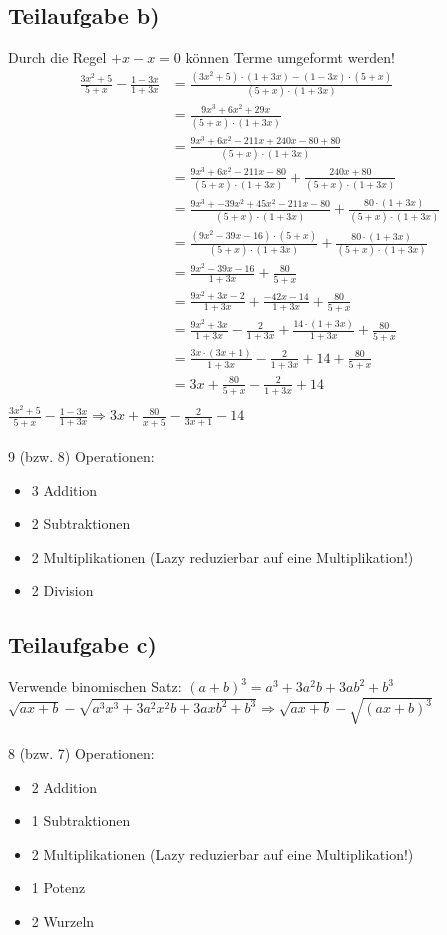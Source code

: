 \documentclass{llncs}
\begin{document}
\subsection*{Teilaufgabe b)}
Durch die Regel $+x-x=0$ können Terme umgeformt werden!
\begin{align*}
\frac{3x^2+5}{5+x}-\frac{1-3x}{1+3x}
&=\frac{(3x^2+5)\cdot (1+3x)-(1-3x)\cdot (5+x)}{(5+x)\cdot (1+3x)}\\
&=\frac{9x^3+6x^2+29x}{(5+x)\cdot (1+3x)}\\
&=\frac{9x^3+6x^2-211x+240x-80+80}{(5+x)\cdot (1+3x)}\\
&=\frac{9x^3+6x^2-211x-80}{(5+x)\cdot (1+3x)} + \frac{240x+80}{(5+x)\cdot (1+3x)}\\
&=\frac{9x^3+-39x^2+45x^2-211x-80}{(5+x)\cdot (1+3x)} + \frac{80\cdot(1+3x)}{(5+x)\cdot (1+3x)}\\
&=\frac{(9x^2-39x-16)\cdot (5+x)}{(5+x)\cdot (1+3x)} + \frac{80\cdot(1+3x)}{(5+x)\cdot (1+3x)}\\
&=\frac{9x^2-39x-16}{1+3x} + \frac{80}{5+x}\\
&=\frac{9x^2+3x-2}{1+3x}+ \frac{-42x-14}{1+3x} + \frac{80}{5+x}\\
&=\frac{9x^2+3x}{1+3x}-\frac{2}{1+3x}+ \frac{14\cdot(1+3x)}{1+3x} + \frac{80}{5+x}\\
&=\frac{3x\cdot (3x+1)}{1+3x}-\frac{2}{1+3x}+ 14 + \frac{80}{5+x}\\
&=3x+ \frac{80}{5+x}-\frac{2}{1+3x}+ 14 \\
\end{align*}
$\frac{3x^2+5}{5+x}-\frac{1-3x}{1+3x} \Rightarrow3x + \frac{80}{x+5} - \frac{2}{3x+1} - 14$\\
\\
9 (bzw. 8) Operationen:
\begin{itemize}
\item 3 Addition
\item 2 Subtraktionen
\item 2 Multiplikationen (Lazy reduzierbar auf eine Multiplikation!)
\item 2 Division
\end{itemize}
\subsection*{Teilaufgabe c)}
Verwende binomischen Satz: $(a+b)^3=a^3+3a^2b+3ab^2+b^3$\\
$\sqrt{ax+b} - \sqrt{a^3x^3+3a^2x^2b+3axb^2+b^3}\Rightarrow \sqrt{ax+b} - \sqrt{(ax+b)^3}$\\
\\
8 (bzw. 7) Operationen:
\begin{itemize}
\item 2 Addition
\item 1 Subtraktionen
\item 2 Multiplikationen (Lazy reduzierbar auf eine Multiplikation!)
\item 1 Potenz
\item 2 Wurzeln
\end{itemize}
\end{document}

